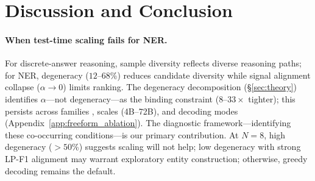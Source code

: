 \section{Discussion and Conclusion}\label{sec:discussion}\label{sec:selection_method}\label{sec:conclusion}

\paragraph{When test-time scaling fails for NER.}
For discrete-answer reasoning, sample diversity reflects diverse reasoning paths; for NER, degeneracy ($12$--$68$\%) reduces candidate diversity while signal alignment collapse ($\alpha{\to}0$) limits ranking.
The degeneracy decomposition (\S\ref{sec:theory}) identifies $\alpha$---not degeneracy---as the binding constraint ($8$--$33{\times}$ tighter); this persists across families \cite{yun2025price}, scales (4B--72B), and decoding modes (Appendix~\ref{app:freeform_ablation}).
The diagnostic framework---identifying these co-occurring conditions---is our primary contribution.
At $N{=}8$, high degeneracy ($>50$\%) suggests scaling will not help; low degeneracy with strong LP-F1 alignment may warrant exploratory entity construction; otherwise, greedy decoding remains the default.

